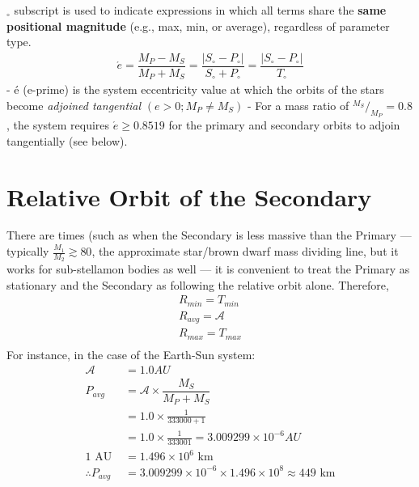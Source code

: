 \documentclass[
  letterpaper,
]{book}
\begin{document}
\(_{\circ}\) subscript is used to indicate expressions in which all
terms share the \textbf{same positional magnitude} (e.g., max, min, or
average), regardless of parameter type. \[
\begin{align}
\acute{e} = \dfrac{M_P - M_S}{M_P + M_S}
= \dfrac{|S_{\circ} - P_{\circ}|}{S_{\circ} + P_{\circ}} 
= \dfrac{|S_{\circ} - P_{\circ}|}{T_{\circ}}
\end{align}
\] - \(é\) (e-prime) is the system eccentricity value at which the
orbits of the stars become \emph{\emph{adjoined tangential}}
\((e \gt 0; M_P \neq M_S)\) - For a mass ratio of
\(^{M_S}/_{M_P} = 0.8\), the system requires \(\acute{e} \geq 0.8519\)
for the primary and secondary orbits to adjoin tangentially (see below).

\chapter{Relative Orbit of the
Secondary}\label{relative-orbit-of-the-secondary}

There are times (such as when the Secondary is less massive than the
Primary --- typically \(\frac{M_1}{M_2} \gtrsim 80\), the approximate
star/brown dwarf mass dividing line, but it works for sub-stellamon
bodies as well --- it is convenient to treat the Primary as stationary
and the Secondary as following the relative orbit alone. Therefore, \[
\begin{gather}
R_{min} = T_{min} \\[0.5em]
R_{avg} = \mathcal{A} \\[0.5em]
R_{max} = T_{max} \\
\end{gather}
\] For instance, in the case of the Earth-Sun system: \[
\begin{align}
\mathcal{A} &= 1.0 AU \\[0.5em]
P_{avg} &= \mathcal{A} \times\dfrac{M_S}{M_P+M_S} \\[1em]
&= 1.0 \times \frac{1}{333000+1} \\[1em]
&= 1.0 \times \frac{1}{333001} = 3.009299 \times 10^{-6} AU \\[1.5em]
1 \text{ AU } &= 1.496 \times 10^6 \text{ km} \\
\therefore P_{avg} &= 3.009299 \times 10^{-6} \times 1.496 \times 10^8 ≈ 449 \text{ km}  
\end{align}
\]
\end{document}
